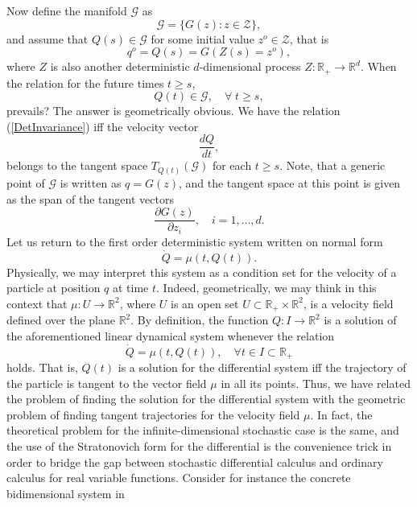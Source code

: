 Now define the manifold $\mathcal{G}$ as
\begin{equation}
\mathcal{G}=\{ G(z) : z \in \mathcal{Z}\},
\end{equation}
and assume that $Q(s)\in \mathcal{G}$ for some initial value $z^o \in
\mathcal{Z}$, that is
\begin{equation}
q^o=Q(s)=G(Z(s)=z^o),
\end{equation}
where $Z$ is also another deterministic $d$-dimensional process $Z:
\mathbb{R}_+ \rightarrow \mathbb{R}^d$. When the relation for the future
times $t\geq s$,
\begin{equation}
\label{DetInvariance}
Q(t) \in \mathcal{G}, \quad \forall\; t\geq s,
\end{equation}
prevails? The answer is geometrically obvious. We have the relation
(\ref{DetInvariance}) iff the velocity vector
$$
\frac{dQ}{dt},
$$
belongs to the tangent space $T_{Q(t)}(\mathcal{G})$ for each $t\geq
s$. Note, that a generic point of $\mathcal{G}$ is written as
$q=G(z)$, and the tangent space at this point is given as the span of
the tangent vectors
\begin{equation}
\label{SimpleCDC}
\frac{\partial G(z)}{\partial z_i}, \quad i=1, \dots, d.
\end{equation}
Let us return to the first order deterministic system written on
normal form 
$$
\dot{Q}=\mu(t,Q(t)).
$$
Physically, we may interpret this system as a condition set for the
velocity of a particle at position $q$ at time $t$. Indeed,
geometrically, we may think in this context that $\mu: U \rightarrow
\mathbb{R}^2$, where $U$ is an open set $U\subset \mathbb{R}_+ \times
\mathbb{R}^2$, is a velocity field defined over the plane 
$\mathbb{R}^2$. By definition, the function $Q : I \rightarrow
\mathbb{R}^2$ is a solution of the aforementioned linear dynamical
system whenever the relation 
$$
\dot{Q}=\mu(t,Q(t)), \quad \forall t\in I \subset \mathbb{R}_+
$$
holds.
That is, $Q(t)$ is a solution for the differential system iff the
trajectory of the particle is tangent to the vector field $\mu$ in all
its points. Thus, we have related the problem of finding the solution
for the differential system with the geometric problem of finding
tangent trajectories for the velocity field $\mu$. In fact, the
theoretical problem for the infinite-dimensional stochastic case is
the same, and the use of the Stratonovich form for the differential is
the convenience trick in order to bridge the gap between stochastic
differential calculus and ordinary calculus for real variable
functions. Consider for instance the concrete bidimensional system in  
